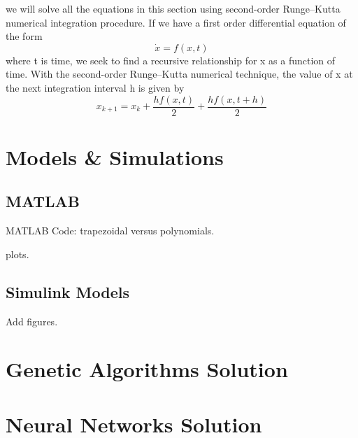 we will solve all the equations in this section using second-order Runge–Kutta numerical integration procedure. If we have a first order differential equation of the form 
\begin{equation*}
	\dot{x} = f(x,t) 
\end{equation*} 
 where t is time, we seek to find a recursive relationship for x as a function of time.
 With the second-order Runge–Kutta numerical technique, the value of x at the
 next integration interval h is given by
 \begin{equation*}
 	x_{k+1} = x_k + \dfrac{hf(x,t)}{2} + \dfrac{h f(x, t+h)}{2}
 \end{equation*}
\section{Models \& Simulations}

\subsection{MATLAB}
MATLAB Code: trapezoidal versus polynomials.

plots.
\subsection{Simulink Models}

Add figures.

\section{Genetic Algorithms Solution}

\section{Neural Networks Solution}
